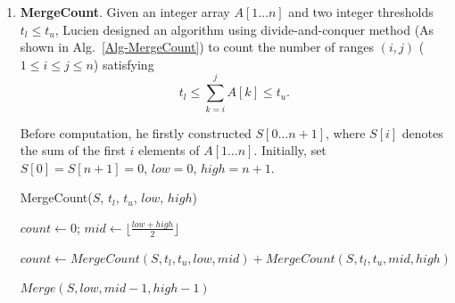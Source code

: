 \documentclass[12pt,a4paper]{article}
\theoremstyle{definition}
\begin{document}
\begin{enumerate}
    \item
    \textbf{MergeCount}. Given an integer array $A[1 \ldots n]$ and two integer thresholds $t_l \le t_u$, Lucien designed an algorithm using divide-and-conquer method (As shown in Alg.~\ref{Alg-MergeCount}) to count the number of ranges $(i,j)$ ($1 \leq i \leq j \leq n$) satisfying
    \begin{equation}\label{Eqn-MergeCount}
    t_l \leq \sum_{k=i}^{j}{A[k]} \leq t_u.
    \end{equation}

    Before computation, he firstly constructed $S[0 \ldots n+1]$, where $S[i]$ denotes the sum of the first $i$ elements of $A[1 \ldots n]$. Initially, set $S[0]=S[n+1]=0$, $low=0$, $high=n+1$.

\begin{minipage}[t]{0.90\textwidth}
	\begin{algorithm}[H]
		\BlankLine
		\caption{MergeCount($S$, $t_l$, $t_u$, $low$, $high$)}
		\label{Alg-MergeCount}
		
		$count \leftarrow 0$; $mid\leftarrow \lfloor \frac{low+high}{2} \rfloor$\;
		
		
		$count\leftarrow MergeCount(S, t_l, t_u, low, mid)+ MergeCount(S, t_l, t_u, mid, high)$\;
		
		$Merge(S,low,mid-1,high-1)$  
		
		\;
		

\end{algorithm}
\end{minipage}
\end{enumerate}
\end{document}
